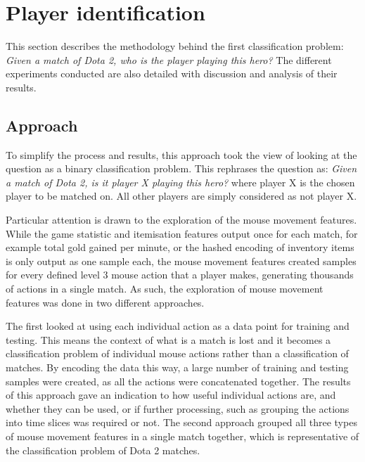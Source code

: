 \documentclass[Report.tex]{subfiles}
\begin{document}
\section{Player identification}\label{sec:game-classification}
This section describes the methodology behind the first classification problem: \textit{Given a match of Dota 2, who is the player playing this hero?} The different experiments conducted are also detailed with discussion and analysis of their results. 



\subsection{Approach}\label{sec:game-approach}
To simplify the process and results, this approach took the view of looking at the question as a binary classification problem. This rephrases the question as: \textit{Given a match of Dota 2, is it player X playing this hero?} where player X is the chosen player to be matched on. All other players are simply considered as not player X. 

Particular attention is drawn to the exploration of the mouse movement features. While the game statistic and itemisation features output once for each match, for example total gold gained per minute, or the hashed encoding of inventory items is only output as one sample each, the mouse movement features created samples for every defined level 3 mouse action that a player makes, generating thousands of actions in a single match. As such, the exploration of mouse movement features was done in two different approaches. 

The first looked at using each individual action as a data point for training and testing. This means the context of what is a match is lost and it becomes a classification problem of individual mouse actions rather than a classification of matches. By encoding the data this way, a large number of training and testing samples were created, as all the actions were concatenated together. The results of this approach gave an indication to how useful individual actions are, and whether they can be used, or if further processing, such as grouping the actions into time slices was required or not. The second approach grouped all three types of mouse movement features in a single match together, which is representative of the classification problem of Dota 2 matches. 

\end{document}
